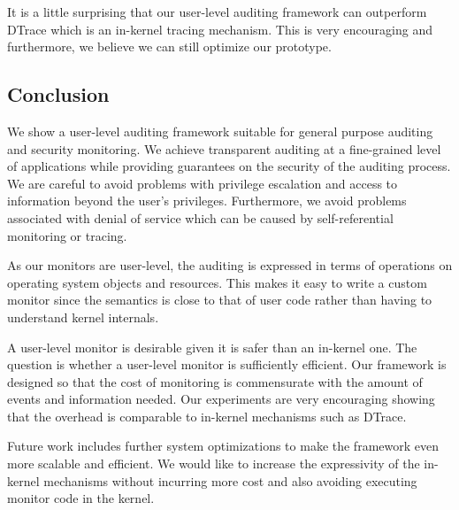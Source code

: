 It is a little surprising that our user-level auditing framework
can outperform DTrace which is an in-kernel tracing mechanism.
This is very encouraging and furthermore, 
we believe we can still optimize our prototype.

\subsection{Conclusion}

We show a user-level auditing framework suitable for general purpose
auditing and security monitoring. 
We achieve transparent auditing
at a fine-grained level of applications while providing guarantees
on the security of the auditing process. We are careful to avoid problems
with privilege escalation and access to information beyond the user's
privileges. Furthermore, we avoid problems associated with denial of
service which can be caused by self-referential monitoring or tracing.

As our monitors are user-level, the auditing is expressed in terms
of operations on operating system objects and resources. This makes it
easy to write a custom monitor since the semantics is close to that
of user code rather than having to understand kernel internals.

A user-level monitor is desirable given it is safer than an in-kernel one.
The question is whether a user-level monitor is sufficiently efficient. 
Our framework is designed so that the cost of monitoring
is commensurate with the amount of events and information needed.
Our experiments are very encouraging 
showing that the overhead is comparable to in-kernel 
mechanisms such as DTrace.

Future work includes further system optimizations to make the framework
even more scalable and efficient. We would like to increase the
expressivity of the in-kernel mechanisms without incurring more cost
and also avoiding executing monitor code in the kernel.

